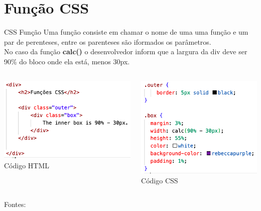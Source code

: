 \documentclass{beamer}
\begin{document}
\section{Função CSS}
\begin{frame}{CSS Função}
Uma função consiste em chamar o nome de uma uma função e um par de perenteses, entre os parenteses são iformados os parâmetros.\\
No caso da função \textbf{calc()} o desenvolvedor inform que a largura da div deve ser 90\% do bloco onde ela está, menos 30px.\\
\begin{columns}
\begin{column}{0.5\textwidth}
        \begin{center}
		  \includegraphics[height=0.4\paperheight]{fig/aula2/layout_html1.png} \\
		  \tiny{Código HTML}
	  \end{center}
   \end{column}
   \begin{column}{0.5\textwidth}
        \begin{center}
		  \includegraphics[height=0.4\paperheight]{fig/aula2/layout_css2.png} \\
		  \tiny{Código CSS}
	  \end{center}
	  
   \end{column}
\end{columns}
 \tiny Fontes: \cite{mdn2023}
\end{frame}
\end{document}
